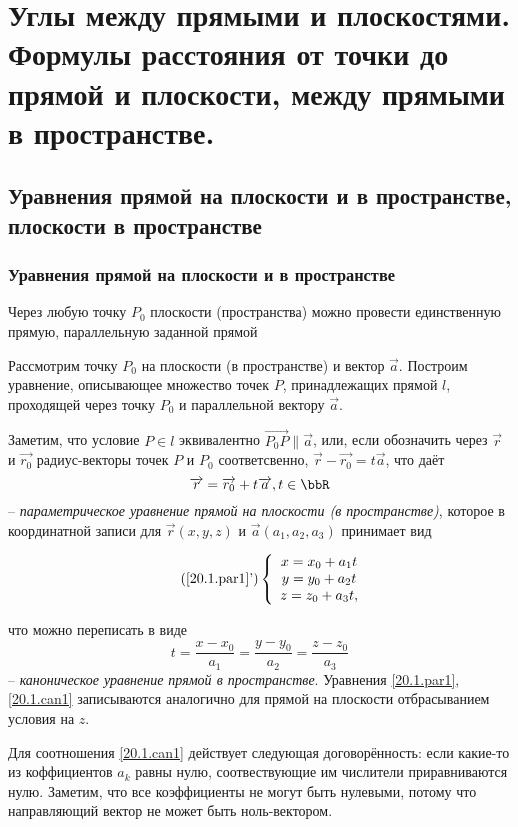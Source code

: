 \chapter{Углы между прямыми и плоскостями. Формулы расстояния от точки до прямой и плоскости, между прямыми в пространстве.}
\section{Уравнения прямой на плоскости и в пространстве, плоскости в пространстве}
\subsection{Уравнения прямой на плоскости и в пространстве}
\begin{axiome} 
  Через любую точку $P_0$ плоскости (пространства) можно провести единственную прямую, параллельную заданной прямой
\end{axiome}
  Рассмотрим точку $P_0$ на плоскости (в пространстве) и вектор $\overrightarrow{a}$. Построим уравнение, описывающее множество точек $P$, принадлежащих прямой $l$, проходящей через точку $P_0$ и параллельной вектору $\overrightarrow{a}$.

  Заметим, что условие $P \in l$ эквивалентно $ \overrightarrow{P_0P} \parallel \overrightarrow{a} $, или, если обозначить через $\overrightarrow{r}$ и $\overrightarrow{r_0}$ радиус-векторы точек $P$ и $P_0$ соответсвенно, $\overrightarrow{r}-\overrightarrow{r_0} = t\overrightarrow{a}$, что даёт
\begin{equation}\label{20.1.par1}
\overrightarrow{r}=\overrightarrow{r_0}+t\overrightarrow{a}, t \in \bbR
\end{equation}
-- \textit{параметрическое уравнение прямой на плоскости (в пространстве)}, которое в координатной записи для $\overrightarrow{r}(x,y,z)$ и $\overrightarrow{a}(a_1,a_2,a_3)$ принимает вид

\begin{equation}\label{20.1.par2}\tag{\ref{20.1.par1}'}
  \left\lbrace\begin{array}{crl}
  x=x_0+a_1t\\
  y=y_0+a_2t\\
  z=z_0+a_3t,\\ 
  \end{array}\right.
\end{equation}

что можно переписать в виде
\begin{equation}\label{20.1.can1}
t=\frac{x-x_0}{a_1}=\frac{y-y_0}{a_2}=\frac{z-z_0}{a_3}
\end{equation}
-- \textit{каноническое уравнение прямой в пространстве}.
  Уравнения \ref{20.1.par1}, \ref{20.1.can1} записываются аналогично для прямой на плоскости отбрасыванием условия на $z$.
  \begin{notion}
  Для соотношения \ref{20.1.can1} действует следующая договорённость: если какие-то из коффициентов $a_k$ равны нулю, соотвествующие им числители приравниваются нулю. Заметим, что все коэффициенты не могут быть нулевыми, потому что направляющий вектор не может быть ноль-вектором.
  \end{notion}
  
